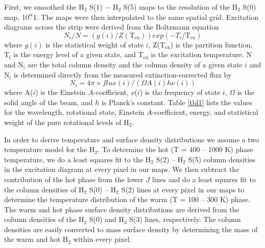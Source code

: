 \documentclass[manuscript]{aastex}
\begin{document}
First, we smoothed the H$_2$ S(1) $-$ H$_2$ S(5)
maps to the resolution of the H$_2$ S(0) map, 10$\mbox{$.\!\!^{\prime\prime}$}$1.
The maps were then interpolated to the same spatial grid.  Excitation
diagrams across the strip were derived from the Boltzmann equation
\begin{equation}
N_i/N = (g(i)/Z(\mathrm{T_{ex}}))exp(-T_i/\mathrm{T_{ex}})
\end{equation}
where $g(i)$ is the statistical weight of state $i$,
Z($\mathrm{T_{ex}}$) is the partition function, $\mathrm{T_i}$ is the
energy level of a given state, and $\mathrm{T_{ex}}$ is the excitation
temperature.  N and $\mathrm{N_i}$ are the total column density and
the column density of a given state $i$ and $\mathrm{N_i}$ is
determined directly from the measured extinction-corrected flux by
\begin{equation}
N_i = 4 \pi \times flux(i)/(\Omega A(i)h\nu (i))
\end{equation}
where A($i$) is the Einstein $A$-coefficient, $\nu$($i$) is the
frequency of state $i$, $\Omega$ is the solid angle of the beam, and
$h$ is Planck's constant.  Table \ref{tbl1} lists the values for the
wavelength, rotational state, Einstein $A$-coefficient, energy, and
statistical weight of the pure rotational levels of $\mathrm{H_2}$.

In order to derive temperature and surface density 
distributions we assume a two temperature model for the 
H$_2$.  To determine the hot (T = 400 -- 1000 K) 
phase temperature, we do a least squares fit 
to the H$_2$ S(2) -- H$_2$ S(5) column densities in the 
excitation diagram at every pixel in our maps.   
We then subtract the contribution of the hot phase from the lower $J$ 
lines and do a least squares fit to the column densities of 
H$_2$ S(0) -- H$_2$ S(2) lines at every pixel in our 
maps to determine the temperature distribution 
of the warm (T = 100 -- 300 K) phase.  The warm and hot 
phase surface density distributions are derived from the 
column densities of the H$_2$ S(0) and H$_2$ S(3) lines, 
respectively.  The column densities are easily converted 
to mass surface density by determining the mass of the 
warm and hot H$_2$ within every pixel. 
\end{document}
